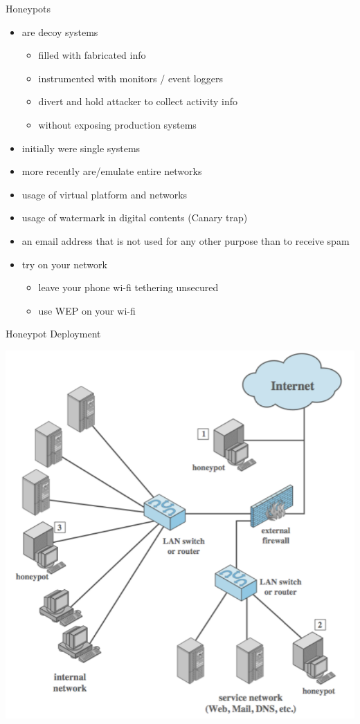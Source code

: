 \documentclass{beamer}
\begin{document}
\begin{frame}{Honeypots}
  \begin{itemize}
  \item are decoy systems 
    \begin{itemize}
    \item filled with fabricated info 
    \item instrumented with monitors / event loggers 
    \item divert and hold attacker to collect activity info 
    \item without exposing production systems 
    \end{itemize}
  \item initially were single systems 
  \item more recently are/emulate entire networks
  \item usage of virtual platform and networks
  \item usage of watermark in digital contents (Canary trap)
  \item an email address that is not used for any other purpose than
    to receive spam
  \item try on your network
    \begin{itemize}
      \item leave your phone wi-fi tethering unsecured
      \item use WEP on your wi-fi
    \end{itemize}
  \end{itemize}
\end{frame}

\begin{frame}{Honeypot Deployment}
   \begin{center}
    \includegraphics[width=0.6\linewidth]{honeypot}
  \end{center}
\end{frame}
\end{document}
